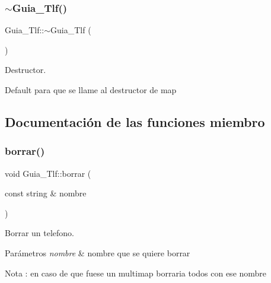 \subsubsection{\texorpdfstring{$\sim$\+Guia\+\_\+\+Tlf()}{~Guia\_Tlf()}}
{\footnotesize\ttfamily Guia\+\_\+\+Tlf\+::$\sim$\+Guia\+\_\+\+Tlf (\begin{DoxyParamCaption}{ }\end{DoxyParamCaption})\hspace{0.3cm}{\ttfamily [default]}}



Destructor. 

Default para que se llame al destructor de map 

\subsection{Documentación de las funciones miembro}
\mbox{\label{classGuia__Tlf_a57e32bbc9e76567d22e5275d4d2a6515}} 
\subsubsection{\texorpdfstring{borrar()}{borrar()}\hspace{0.1cm}{\footnotesize\ttfamily [1/2]}}
{\footnotesize\ttfamily void Guia\+\_\+\+Tlf\+::borrar (\begin{DoxyParamCaption}\item[{const string \&}]{nombre }\end{DoxyParamCaption})\hspace{0.3cm}{\ttfamily [inline]}}



Borrar un telefono. 


\begin{DoxyParams}{Parámetros}
{\em nombre} & nombre que se quiere borrar \\
\hline
\end{DoxyParams}
\begin{DoxyNote}{Nota}
\+: en caso de que fuese un multimap borraria todos con ese nombre 
\end{DoxyNote}
\mbox{\label{classGuia__Tlf_af8adac24fd35985b9016a4a38cca60f4}} 
